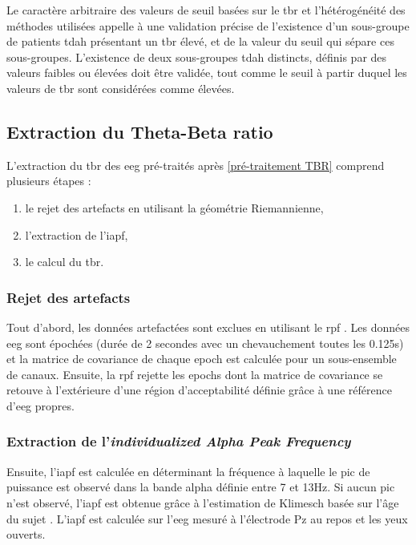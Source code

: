 Le caractère arbitraire des valeurs de seuil basées sur le \gls{tbr} et l'hétérogénéité des méthodes utilisées appelle à une validation précise de l'existence d'un 
sous-groupe de patients \gls{tdah} présentant un \gls{tbr} élevé, et de la valeur du seuil qui sépare ces sous-groupes. L'existence de deux sous-groupes \gls{tdah} distincts, 
définis par des valeurs faibles ou élevées doit être validée, tout comme le seuil à partir duquel les valeurs de \gls{tbr} sont considérées comme élevées.  
 

\subsection{Extraction du Theta-Beta ratio}
L'extraction du \gls{tbr} des \gls{eeg} pré-traités après \ref{pré-traitement TBR} comprend plusieurs étapes :
\begin{enumerate}
\item le rejet des artefacts en utilisant la géométrie Riemannienne,
\item l'extraction de l'\gls{iapf},
\item le calcul du \gls{tbr}.
\end{enumerate}

\subsubsection{Rejet des artefacts}
Tout d'abord, les données artefactées sont exclues en utilisant le \gls{rpf} \citep{Barthelemy2019}. Les données \gls{eeg} sont épochées (durée de 2 secondes avec 
un chevauchement toutes les 0.125s) et la matrice de covariance de chaque epoch est calculée pour un sous-ensemble de canaux. Ensuite, la \gls{rpf} rejette les 
epochs dont la matrice de covariance se retouve à l'extérieure d'une région d'acceptabilité définie grâce à une référence d'\gls{eeg} propres. 

\subsubsection{Extraction de l'\textit{individualized Alpha Peak Frequency}}
Ensuite, l'\gls{iapf} est calculée en déterminant la fréquence à laquelle le pic de puissance est observé dans la bande alpha définie entre 7 et 13Hz. Si aucun pic n'est observé,
l'\gls{iapf} est obtenue grâce à l'estimation de Klimesch basée sur l'âge du sujet \citep{Klimesch1999}. L'\gls{iapf} est calculée sur l'\gls{eeg} mesuré à l'électrode Pz au repos
et les yeux ouverts. 

